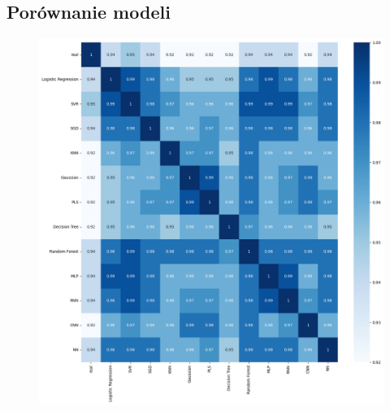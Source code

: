 \subsection{Porównanie modeli}

\begin{figure}[H]
    \centering
    \includegraphics[width=\textwidth]{images/pred_corr.png}
    \caption{}
    \label{pred_corr}
\end{figure}


